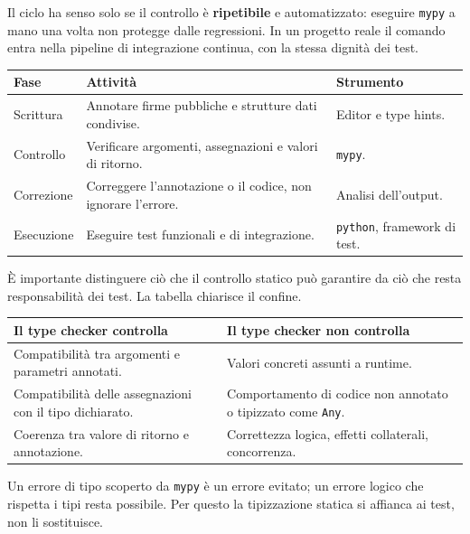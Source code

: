 \documentclass[12pt]{extarticle}
\begin{document}
\noindent Il ciclo ha senso solo se il controllo è \textbf{ripetibile} e automatizzato: eseguire \texttt{mypy} a mano una volta non protegge dalle regressioni. In un progetto reale il comando entra nella pipeline di integrazione continua, con la stessa dignità dei test.

\begin{center}
\small
\begin{tabular}{p{3.8cm}p{6.0cm}p{4.6cm}}
    \toprule
    \textbf{Fase} & \textbf{Attività} & \textbf{Strumento} \\
    \midrule
    Scrittura & Annotare firme pubbliche e strutture dati condivise. & Editor e type hints. \\
    \addlinespace
    Controllo & Verificare argomenti, assegnazioni e valori di ritorno. & \texttt{mypy}. \\
    \addlinespace
    Correzione & Correggere l'annotazione o il codice, non ignorare l'errore. & Analisi dell'output. \\
    \addlinespace
    Esecuzione & Eseguire test funzionali e di integrazione. & \texttt{python}, framework di test. \\
    \bottomrule
\end{tabular}
\end{center}

\noindent È importante distinguere ciò che il controllo statico può garantire da ciò che resta responsabilità dei test. La tabella chiarisce il confine.

\begin{center}
\small
\begin{tabular}{p{7.4cm}p{7.0cm}}
    \toprule
    \textbf{Il type checker controlla} & \textbf{Il type checker non controlla} \\
    \midrule
    Compatibilità tra argomenti e parametri annotati. & Valori concreti assunti a runtime. \\
    \addlinespace
    Compatibilità delle assegnazioni con il tipo dichiarato. & Comportamento di codice non annotato o tipizzato come \texttt{Any}. \\
    \addlinespace
    Coerenza tra valore di ritorno e annotazione. & Correttezza logica, effetti collaterali, concorrenza. \\
    \bottomrule
\end{tabular}
\end{center}

\noindent Un errore di tipo scoperto da \texttt{mypy} è un errore evitato; un errore logico che rispetta i tipi resta possibile. Per questo la tipizzazione statica si affianca ai test, non li sostituisce.
\end{document}
